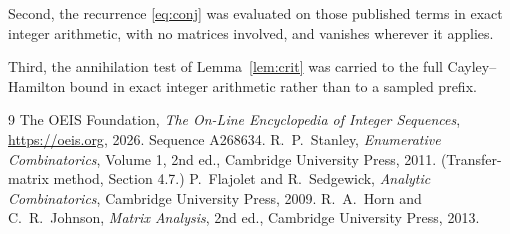 \documentclass[11pt,a4paper]{article}
\theoremstyle{plain}
\theoremstyle{definition}
\begin{document}
Second, the recurrence \eqref{eq:conj} was evaluated on those published terms in exact
integer arithmetic, with no matrices involved, and vanishes wherever it applies.

Third, the annihilation test of Lemma~\ref{lem:crit} was carried to the full
Cayley--Hamilton bound in exact integer arithmetic rather than to a sampled prefix.

\begin{thebibliography}{9}
 The OEIS Foundation, \emph{The On-Line Encyclopedia of Integer
Sequences}, \url{https://oeis.org}, 2026. Sequence A268634.
 R.~P.~Stanley, \emph{Enumerative Combinatorics}, Volume 1, 2nd ed.,
Cambridge University Press, 2011. (Transfer-matrix method, Section 4.7.)
 P.~Flajolet and R.~Sedgewick, \emph{Analytic Combinatorics}, Cambridge
University Press, 2009.
 R.~A.~Horn and C.~R.~Johnson, \emph{Matrix Analysis}, 2nd ed., Cambridge
University Press, 2013.
\end{thebibliography}
\end{document}
